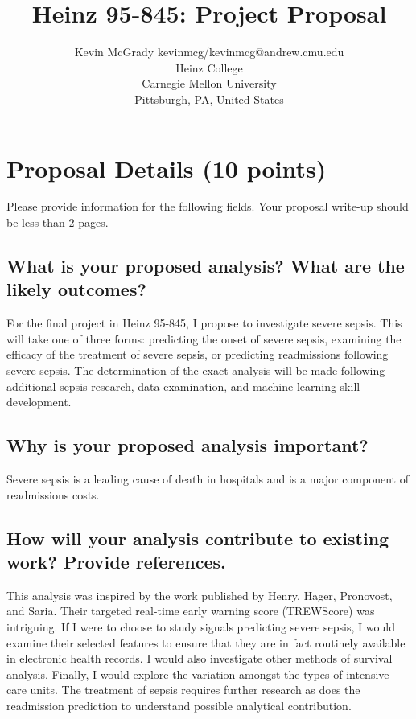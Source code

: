 \documentclass[twoside,11pt]{article}
\begin{document}
\title{Heinz 95-845: Project Proposal}

\author{\name Kevin McGrady \email kevinmcg/kevinmcg@andrew.cmu.edu \\
       \addr Heinz College\\
       Carnegie Mellon University\\
       Pittsburgh, PA, United States} 

\maketitle

\section{Proposal Details (10 points)} \label{details}
Please provide information for the following fields. Your proposal write-up should be less than 2 pages.

\subsection{What is your proposed analysis? What are the likely outcomes?}
For the final project in Heinz 95-845, I propose to investigate severe sepsis. This will take one of three forms: predicting the onset of severe sepsis, examining the efficacy of the treatment of severe sepsis, or predicting readmissions following severe sepsis. The determination of the exact analysis will be made following additional sepsis research, data examination, and machine learning skill development. 

\subsection{Why is your proposed analysis important?}
Severe sepsis is a leading cause of death in hospitals and is a major component of readmissions costs. 

\subsection{How will your analysis contribute to existing work? Provide references.}
This analysis was inspired by the work published by Henry, Hager, Pronovost, and Saria. Their targeted real-time early warning score (TREWScore) was intriguing. If I were to choose to study signals predicting severe sepsis, I would examine their selected features to ensure that they are in fact routinely available in electronic health records. I would also investigate other methods of survival analysis. Finally, I would explore the variation amongst the types of intensive care units. The treatment of sepsis requires further research as does the readmission prediction to understand possible analytical contribution. 
\end{document}
